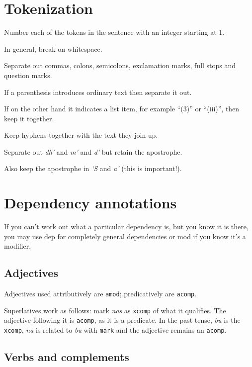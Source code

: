 \documentclass[a4paper]{article}
\begin{document}
\section{Tokenization}

 Number each of the tokens in the sentence with an integer starting at 1.

 In general, break on whitespace.

 Separate out commas, colons, semicolons, exclamation marks, full stops and question marks.

 If a parenthesis introduces ordinary text then separate it out.

 If on the other hand it indicates a list item, for example ``(3)'' or ``(iii)'', then keep it together.

 Keep hyphens together with the text they join up.

 Separate out \textit{dh'} and \textit{m'} and \textit{d'} but retain the apostrophe.

 Also keep the apostrophe in \textit{`S} and \textit{a'} (this is important!).

\section{Dependency annotations}

 If you can't work out what a particular dependency is, but you know it is there, you may use dep for completely general dependencies or mod if you know it's a modifier.

\subsection{Adjectives}

 Adjectives used attributively are \texttt{amod}; predicatively are \texttt{acomp}.

 Superlatives work as follows: mark \textit{nas} as \texttt{xcomp} of what it qualifies. The adjective following it is \texttt{acomp}, as it is a predicate. In the past tense, \textit{bu} is the \texttt{xcomp}, \textit{na} is related to \textit{bu} with \texttt{mark} and the adjective remains an \texttt{acomp}.

\subsection{Verbs and complements}
\end{document}
